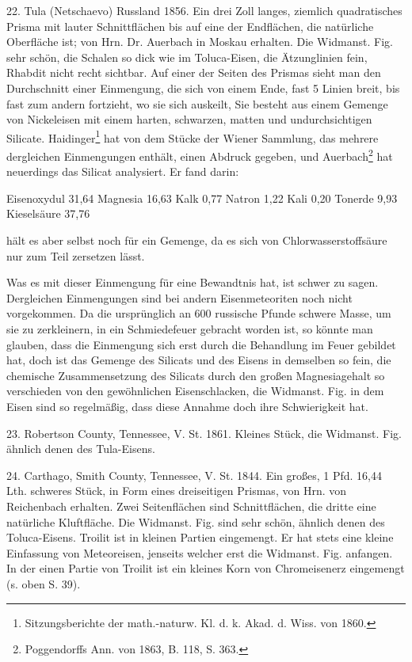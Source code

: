 \documentclass[a4paper, 11pt, oneside]{article}
\begin{document}
22. Tula (Netschaevo) Russland 1856. Ein drei Zoll langes, ziemlich quadratisches Prisma mit lauter Schnittflächen bis auf eine der Endflächen, die natürliche Oberfläche ist; von Hrn. Dr. Auerbach in Moskau erhalten. Die Widmanst. Fig. sehr schön, die Schalen so dick wie im Toluca-Eisen, die Ätzunglinien fein, Rhabdit nicht recht sichtbar. Auf einer der Seiten des Prismas sieht man den Durchschnitt einer Einmengung, die sich von einem Ende, fast 5 Linien breit, bis fast zum andern fortzieht, wo sie sich auskeilt, Sie besteht aus einem Gemenge von Nickeleisen mit einem harten, schwarzen, matten und undurchsichtigen Silicate. Haidinger\footnote{Sitzungsberichte der math.-naturw. Kl. d. k. Akad. d. Wiss. von 1860.} hat von dem Stücke der Wiener Sammlung, das mehrere dergleichen Einmengungen enthält, einen Abdruck gegeben, und Auerbach\footnote{Poggendorffs Ann. von 1863, B. 118, S. 363.} hat neuerdings das Silicat analysiert. Er fand darin:

Eisenoxydul 31,64  
Magnesia 16,63  
Kalk 0,77  
Natron 1,22  
Kali 0,20  
Tonerde 9,93  
Kieselsäure 37,76  

hält es aber selbst noch für ein Gemenge, da es sich von Chlorwasserstoffsäure nur zum Teil zersetzen lässt.

Was es mit dieser Einmengung für eine Bewandtnis hat, ist schwer zu sagen. Dergleichen Einmengungen sind bei andern Eisenmeteoriten noch nicht vorgekommen. Da die ursprünglich an 600 russische Pfunde schwere Masse, um sie zu zerkleinern, in ein Schmiedefeuer gebracht worden ist, so könnte man glauben, dass die Einmengung sich erst durch die Behandlung im Feuer gebildet hat, doch ist das Gemenge des Silicats und des Eisens in demselben so fein, die chemische Zusammensetzung des Silicats durch den großen Magnesiagehalt so verschieden von den gewöhnlichen Eisenschlacken, die Widmanst. Fig. in dem Eisen sind so regelmäßig, dass diese Annahme doch ihre Schwierigkeit hat.

23. Robertson County, Tennessee, V. St. 1861. Kleines Stück, die Widmanst. Fig. ähnlich denen des Tula-Eisens.

24. Carthago, Smith County, Tennessee, V. St. 1844. Ein großes, 1 Pfd. 16,44 Lth. schweres Stück, in Form eines dreiseitigen Prismas, von Hrn. von Reichenbach erhalten. Zwei Seitenflächen sind Schnittflächen, die dritte eine natürliche Kluftfläche. Die Widmanst. Fig. sind sehr schön, ähnlich denen des Toluca-Eisens. Troilit ist in kleinen Partien eingemengt. Er hat stets eine kleine Einfassung von Meteoreisen, jenseits welcher erst die Widmanst. Fig. anfangen. In der einen Partie von Troilit ist ein kleines Korn von Chromeisenerz eingemengt (s. oben S. 39).
\end{document}
